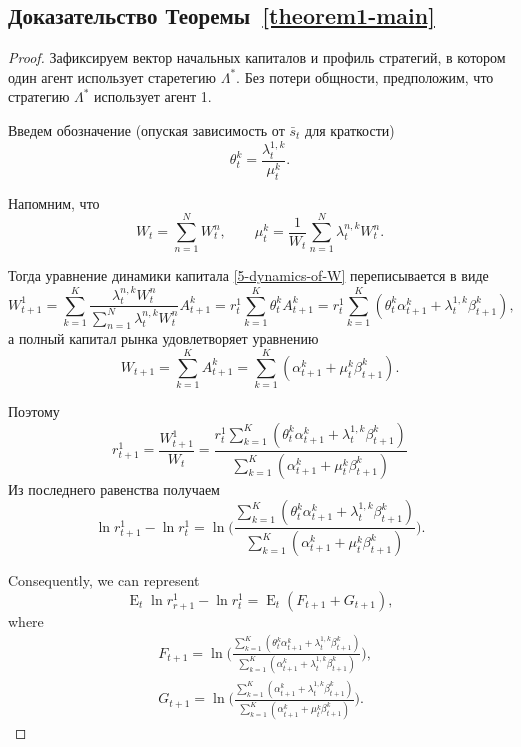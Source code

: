 \documentclass[a4paper,12pt,russian]{article} %
\theoremstyle{definition}
\DeclareMathOperator{\E}{E}
\begin{document}
\subsection{Доказательство Теоремы~\ref{theorem1-main}}

\begin{proof}
Зафиксируем вектор начальных капиталов и профиль стратегий, в котором один агент использует старетегию $\Lambda^*$.
Без потери общности, предположим, что стратегию $\Lambda^*$ использует агент 1. 

Введем обозначение (опуская зависимость от $\bar s_t$ для краткости) 
\[
\theta_{t}^k = \frac{\lambda_{t}^{1,k}}{\mu_{t}^k}.
\]

Напомним, что 
\[
W_t = \sum_{n=1}^N W_t^n, \qquad
\mu_{t}^k = \frac{1}{W_t}\sum_{n=1}^{N}\lambda_{t}^{n,k} W_t^n.
\]

Тогда уравнение динамики капитала \eqref{5-dynamics-of-W} переписывается в виде
\[
W_{t+1}^1 = 
\sum_{k=1}^K \frac{\lambda_{t}^{n,k} W_t^n}{\sum_{n=1}^N \lambda_{t}^{n,k} W_t^n} A_{t+1}^k
=r_t^1 \sum_{k=1}^K \theta_{t}^k A_{t+1}^k 
= r_t^1\sum_{k=1}^K (\theta_{t}^k \alpha_{t+1}^k + \lambda_{t}^{1,k}\beta_{t+1}^k), 
\]
а полный капитал рынка удовлетворяет уравнению 
\[
W_{t+1} = \sum_{k=1}^K A_{t+1}^k 
= \sum_{k=1}^K (\alpha_{t+1}^k + \mu_{t}^k \beta_{t+1}^k).
\]

Поэтому 
\[
r_{t+1}^1 = \frac {W_{t+1}^1}{W_t}= \frac{r_t^1\sum_{k=1}^K (\theta_{t}^k \alpha_{t+1}^k + \lambda_{t}^{1,k}\beta_{t+1}^k)}{\sum_{k=1}^K (\alpha_{t+1}^k + \mu_{t}^k \beta_{t+1}^k)}
\]
Из последнего равенства получаем 
\begin{equation}
\label{25-log-r}
\ln r_{t+1}^1 - \ln r_t^1 
= \ln\Biggl(
  \frac{\sum_{k=1}^K (\theta_{t}^k \alpha_{t+1}^k + \lambda_{t}^{1,k}\beta_{t+1}^k)}
       {\sum_{k=1}^K (\alpha_{t+1}^k + \mu_{t}^k \beta_{t+1}^k)}
  \Biggr).
\end{equation}

Consequently, we can represent
\[
\E_t \ln r_{r+1}^1 - \ln r_t^1 = \E_t(F_{t+1} + G_{t+1}), 
\]
where
\begin{align}
\label{26-F}
&F_{t+1} = \ln \biggl(
  \frac{\sum_{k=1}^K (\theta_{t}^k\alpha_{t+1}^k + \lambda_{t}^{1,k}\beta_{t+1}^k)}
       {\sum_{k=1}^K (\alpha_{t+1}^k + \lambda_{t}^{1,k}\beta_{t+1}^k)}
  \biggr),\\
\label{27-G}
&G_{t+1} = \ln\biggl(
  \frac{\sum_{k=1}^K (\alpha_{t+1}^k + \lambda_{t}^{1,k} \beta_{t+1}^k)}
       {\sum_{k=1}^K (\alpha_{t+1}^k + \mu_{t}^k \beta_{t+1}^k)}
  \biggr).
\end{align}


\end{proof}
\end{document}
